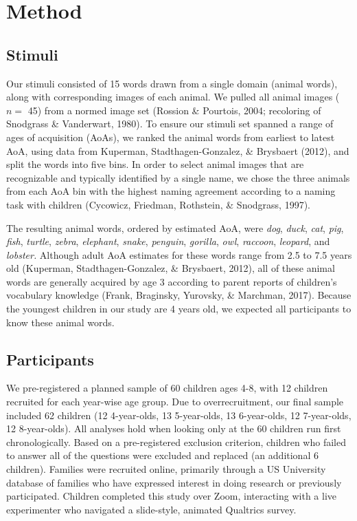 \documentclass[10pt, letterpaper]{article}
\begin{document}
\hypertarget{method}{%
\section{Method}\label{method}}

\hypertarget{stimuli}{%
\subsection{Stimuli}\label{stimuli}}

Our stimuli consisted of 15 words drawn from a single domain (animal
words), along with corresponding images of each animal. We pulled all
animal images (\(n =\) 45) from a normed image set (Rossion \& Pourtois,
2004; recoloring of Snodgrass \& Vanderwart, 1980). To ensure our
stimuli set spanned a range of ages of acquisition (AoAs), we ranked the
animal words from earliest to latest AoA, using data from Kuperman,
Stadthagen-Gonzalez, \& Brysbaert (2012), and split the words into five
bins. In order to select animal images that are recognizable and
typically identified by a single name, we chose the three animals from
each AoA bin with the highest naming agreement according to a naming
task with children (Cycowicz, Friedman, Rothstein, \& Snodgrass, 1997).

The resulting animal words, ordered by estimated AoA, were \emph{dog},
\emph{duck}, \emph{cat}, \emph{pig}, \emph{fish}, \emph{turtle},
\emph{zebra}, \emph{elephant}, \emph{snake}, \emph{penguin},
\emph{gorilla}, \emph{owl}, \emph{raccoon}, \emph{leopard}, and
\emph{lobster.} Although adult AoA estimates for these words range from
2.5 to 7.5 years old (Kuperman, Stadthagen-Gonzalez, \& Brysbaert,
2012), all of these animal words are generally acquired by age 3
according to parent reports of children's vocabulary knowledge (Frank,
Braginsky, Yurovsky, \& Marchman, 2017). Because the youngest children
in our study are 4 years old, we expected all participants to know these
animal words.

\hypertarget{participants}{%
\subsection{Participants}\label{participants}}

We pre-registered a planned sample of 60 children ages 4-8, with 12
children recruited for each year-wise age group. Due to overrecruitment,
our final sample included 62 children (12 4-year-olds, 13 5-year-olds,
13 6-year-olds, 12 7-year-olds, 12 8-year-olds). All analyses hold when
looking only at the 60 children run first chronologically. Based on a
pre-registered exclusion criterion, children who failed to answer all of
the questions were excluded and replaced (an additional 6 children).
Families were recruited online, primarily through a US University
database of families who have expressed interest in doing research or
previously participated. Children completed this study over Zoom,
interacting with a live experimenter who navigated a slide-style,
animated Qualtrics survey.
\end{document}
